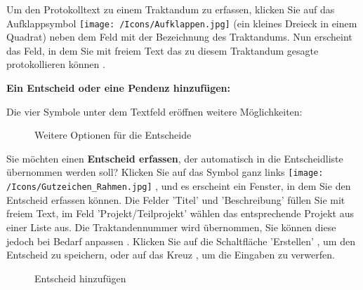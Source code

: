 Um den Protokolltext zu einem Traktandum zu erfassen, klicken Sie auf das Aufklappsymbol \texttt{[image: /Icons/Aufklappen.jpg]}  (ein kleines Dreieck in einem Quadrat) neben dem Feld mit der Bezeichnung des Traktandums. Nun erscheint das Feld, in dem Sie mit freiem Text das zu diesem Traktandum gesagte protokollieren können .

\vspace{\baselineskip}

\textbf{Ein Entscheid oder eine Pendenz hinzufügen:}

\vspace{\baselineskip}

Die vier Symbole unter dem Textfeld eröffnen weitere Möglichkeiten:

\begin{figure}[H]
\caption{Weitere Optionen für die Entscheide}
\end{figure}

Sie möchten einen \textbf{Entscheid erfassen}, der automatisch in die Entscheidliste übernommen werden soll? Klicken Sie auf das Symbol ganz links \texttt{[image: /Icons/Gutzeichen\_Rahmen.jpg]} , und es erscheint ein Fenster, in dem Sie den Entscheid erfassen können. Die Felder 'Titel'  und 'Beschreibung'  füllen Sie mit freiem Text, im Feld 'Projekt/Teilprojekt'  wählen das entsprechende Projekt aus einer Liste aus. Die Traktandennummer wird übernommen, Sie können diese jedoch bei Bedarf anpassen . Klicken Sie auf die Schaltfläche 'Erstellen' , um den Entscheid zu speichern, oder auf das Kreuz , um die Eingaben zu verwerfen.

\begin{figure}[H]
\caption{Entscheid hinzufügen}
\end{figure}

